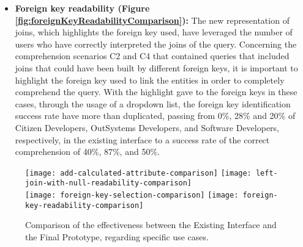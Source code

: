 \begin{itemize}
  \item \textbf{Foreign key readability (Figure \ref{fig:foreignKeyReadabilityComparison}): } The new representation of joins, which highlights the foreign key used, have leveraged the number of users who have correctly interpreted the joins of the query. Concerning the comprehension scenarios C2 and C4 that contained queries that included joins that could have been built by different foreign keys, it is important to highlight the foreign key used to link the entities in order to completely comprehend the query. With the highlight gave to the foreign keys in these cases, through the usage of a dropdown list, the foreign key identification success rate have more than duplicated, passing from 0\%, 28\% and 20\% of Citizen Developers, OutSystems Developers, and Software Developers, respectively, in the existing interface to a success rate of the correct comprehension of 40\%, 87\%, and 50\%.
\end{itemize}

\begin{figure}[tb]
  \centering
    {\texttt{[image: add-calculated-attribute-comparison]}}%
    {\texttt{[image: left-join-with-null-readability-comparison]}}%
    \\
  {\texttt{[image: foreign-key-selection-comparison]}}%
  {\texttt{[image: foreign-key-readability-comparison]}}%
  \caption{Comparison of the effectiveness between the Existing Interface and the Final Prototype, regarding specific use cases.}
  \label{fig:specificComparisons}
\end{figure}

